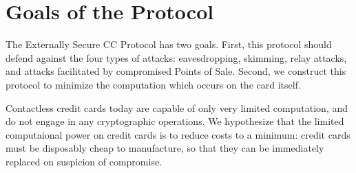 \section{Goals of the Protocol}
\label{sec:external-goals}

The Externally Secure CC Protocol has two goals.
First, this protocol should defend against the four types of attacks:
    eavesdropping, skimming, relay attacks, and attacks facilitated by compromised Points of Sale.
Second, we construct this protocol to minimize the computation which occurs on the card itself.

Contactless credit cards today are capable of only very limited computation, and do not engage in any cryptographic operations.
We hypothesize that the limited computaional power on credit cards is to reduce costs to a minimum:
	credit cards must be disposably cheap to manufacture, so that they can be immediately replaced on suspicion of compromise.
